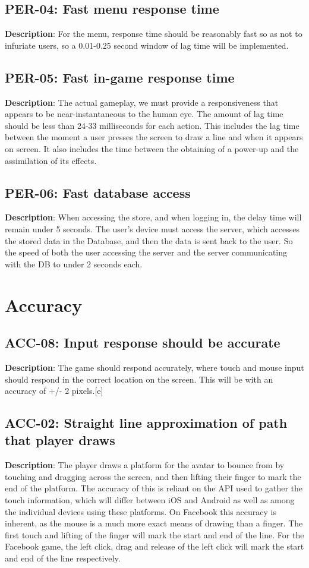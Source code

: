 \subsection{PER-04: Fast menu response time}
\textbf{Description}: For the menu, response time should be reasonably fast
so as not to infuriate users, so a 0.01-0.25 second window of lag
time will be implemented.
\subsection{PER-05: Fast in-game response time}
\textbf{Description}: The actual gameplay, we must provide a responsiveness
that appears to be near-instantaneous to the human eye. The amount of lag time
should be less than 24-33 milliseconds for each action. This includes
the lag time between the moment a user presses the screen to draw
a line and when it appears on screen. It also includes the time between
the obtaining of a power-up and the assimilation of its effects.
\subsection{PER-06: Fast database access}
\textbf{Description}: When accessing the store, and when logging in, the delay
time will remain under 5 seconds. The user\textquoteright{}s device
must access the server, which accesses the stored data in the Database,
and then the data is sent back to the user. So the speed of both the
user accessing the server and the server communicating with the DB
to under 2 seconds each.
\section{Accuracy}
\subsection{ACC-08: Input response should be accurate}
\textbf{Description}: The game should respond accurately, where touch and mouse
input should respond in the correct location on the screen. This will
be with an accuracy of +/- 2 pixels.{[}e{]}
\subsection{ACC-02: Straight line approximation of path that player draws}
\textbf{Description}: The player draws a platform for the avatar to bounce
from by touching and dragging across the screen, and then lifting
their finger to mark the end of the platform. The accuracy of this
is reliant on the API used to gather the touch information, which
will differ between iOS and Android as well as among the individual
devices using these platforms. On Facebook this accuracy is inherent,
as the mouse is a much more exact means of drawing than a finger.
The first touch and lifting of the finger will mark the start and
end of the line. For the Facebook game, the left click, drag and release
of the left click will mark the start and end of the line respectively.
